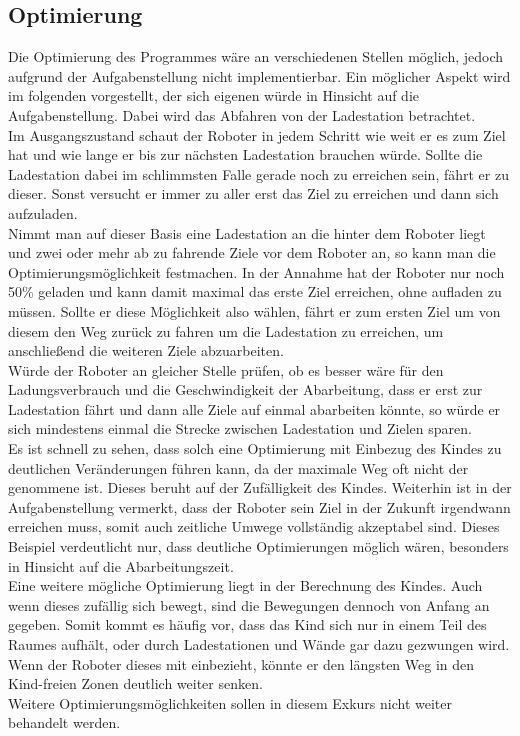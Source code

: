 \subsection{Optimierung}
Die Optimierung des Programmes wäre an verschiedenen Stellen möglich, jedoch aufgrund der Aufgabenstellung nicht implementierbar. Ein möglicher Aspekt wird im folgenden vorgestellt, der sich eigenen würde in Hinsicht auf die Aufgabenstellung. Dabei wird das Abfahren von der Ladestation betrachtet. \\
Im Ausgangszustand schaut der Roboter in jedem Schritt wie weit er es zum Ziel hat und wie lange er bis zur nächsten Ladestation brauchen würde. Sollte die Ladestation dabei im schlimmsten Falle gerade noch zu erreichen sein, fährt er zu dieser. Sonst versucht er immer zu aller erst das Ziel zu erreichen und dann sich aufzuladen. \\
Nimmt man auf dieser Basis eine Ladestation an die hinter dem Roboter liegt und zwei oder mehr ab zu fahrende Ziele vor dem Roboter an, so kann man die Optimierungsmöglichkeit festmachen. In der Annahme hat der Roboter nur noch 50\% geladen und kann damit maximal das erste Ziel erreichen, ohne aufladen zu müssen. Sollte er diese Möglichkeit also wählen, fährt er zum ersten Ziel um von diesem den Weg zurück zu fahren um die Ladestation zu erreichen, um anschließend die weiteren Ziele abzuarbeiten. \\
Würde der Roboter an gleicher Stelle prüfen, ob es besser wäre für den Ladungsverbrauch und die Geschwindigkeit der Abarbeitung, dass er erst zur Ladestation fährt und dann alle Ziele auf einmal abarbeiten könnte, so würde er sich mindestens einmal die Strecke zwischen Ladestation und Zielen sparen. \\
Es ist schnell zu sehen, dass solch eine Optimierung mit Einbezug des Kindes zu deutlichen Veränderungen führen kann, da der maximale Weg oft nicht der genommene ist. Dieses beruht auf der Zufälligkeit des Kindes. Weiterhin ist in der Aufgabenstellung vermerkt, dass der Roboter sein Ziel in der Zukunft irgendwann erreichen muss, somit auch zeitliche Umwege vollständig akzeptabel sind. Dieses Beispiel verdeutlicht nur, dass deutliche Optimierungen möglich wären, besonders in Hinsicht auf die Abarbeitungszeit. \\
Eine weitere mögliche Optimierung liegt in der Berechnung des Kindes. Auch wenn dieses zufällig sich bewegt, sind die Bewegungen dennoch von Anfang an gegeben. Somit kommt es häufig vor, dass das Kind sich nur in einem Teil des Raumes aufhält, oder durch Ladestationen und Wände gar dazu gezwungen wird. Wenn der Roboter dieses mit einbezieht, könnte er den längsten Weg in den Kind-freien Zonen deutlich weiter senken. \\
Weitere Optimierungsmöglichkeiten sollen in diesem Exkurs nicht weiter behandelt werden.


